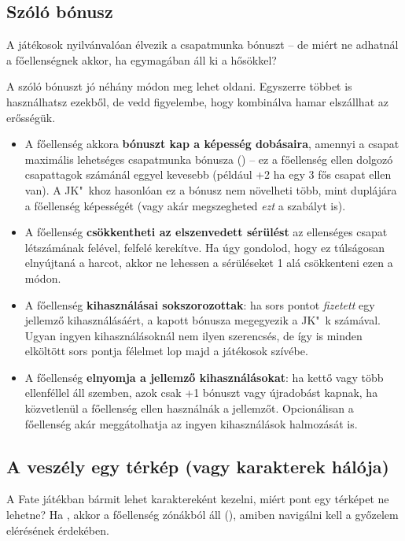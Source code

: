 \subsection{Szóló bónusz}

A játékosok nyilvánvalóan élvezik a csapatmunka bónuszt – de miért ne adhatnál a főellenségnek  akkor, ha egymagában áll ki a hősökkel?

A szóló bónuszt jó néhány módon meg lehet oldani. Egyszerre többet is használhatsz ezekből, de vedd figyelembe, hogy kombinálva hamar elszállhat az erősségük.

\begin{itemize}
    \item A főellenség akkora \textbf{bónuszt kap a képesség dobásaira}, amennyi a csapat maximális lehetséges csapatmunka bónusza () – ez a főellenség ellen dolgozó csapattagok számánál eggyel kevesebb (például +2 ha egy 3 fős csapat ellen van). A JK"~khoz hasonlóan ez a bónusz nem növelheti több, mint duplájára a főellenség képességét (vagy akár megszegheted \emph{ezt} a szabályt is).
    \item A főellenség \textbf{csökkentheti az elszenvedett sérülést} az ellenséges csapat létszámának felével, felfelé kerekítve. Ha úgy gondolod, hogy ez túlságosan elnyújtaná a harcot, akkor ne lehessen a sérüléseket 1 alá csökkenteni ezen a módon.
    \item A főellenség \textbf{kihasználásai sokszorozottak}: ha sors pontot \emph{fizetett} egy jellemző kihasználásáért, a kapott bónusza megegyezik a JK"~k számával. Ugyan ingyen kihasználásoknál nem ilyen szerencsés, de így is minden elköltött sors pontja félelmet lop majd a játékosok szívébe.
    \item A főellenség \textbf{elnyomja a jellemző kihasználásokat}: ha kettő vagy több ellenféllel áll szemben, azok csak +1 bónuszt vagy újradobást kapnak, ha közvetlenül a főellenség ellen használnák a jellemzőt. Opcionálisan a főellenség akár meggátolhatja az ingyen kihasználások halmozását is.
\end{itemize}

\newpage

\subsection{A veszély egy térkép (vagy karakterek hálója)}

A Fate játékban bármit lehet karaktereként kezelni, miért pont egy térképet ne lehetne? Ha , akkor a főellenség zónákból áll (), amiben navigálni kell a győzelem elérésének érdekében.

